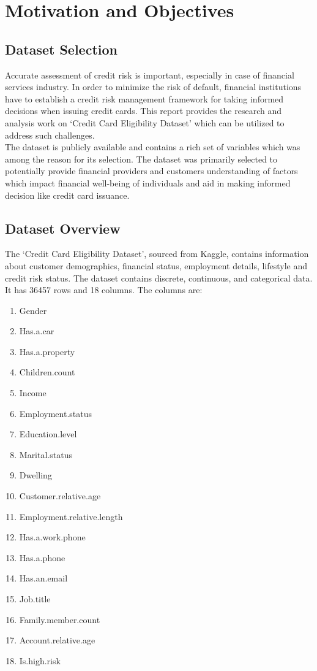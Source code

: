 \documentclass{article}\usepackage[]{graphicx}\usepackage[]{xcolor}
\begin{document}
\section{Motivation and Objectives}

\subsection{Dataset Selection}

Accurate assessment of credit risk is important, especially in case of financial services industry. In order to minimize the risk of default, financial institutions have to establish a credit risk management framework for taking informed decisions when issuing credit cards. This report provides the research and analysis work on `Credit Card Eligibility Dataset' which can be utilized to address such challenges. \\

The dataset is publicly available and contains a rich set of variables which was among the reason for its selection. The dataset was primarily selected to potentially provide financial providers and customers understanding of factors which impact financial well-being of individuals and aid in making informed decision like credit card issuance.

\subsection{Dataset Overview}

The `Credit Card Eligibility Dataset', sourced from Kaggle, contains information about customer demographics, financial status, employment details, lifestyle and credit risk status. The dataset contains discrete, continuous, and categorical data. It has 36457 rows and 18 columns. The columns are:

\begin{enumerate}
\item Gender
\item Has.a.car
\item Has.a.property
\item Children.count
\item Income
\item Employment.status
\item Education.level
\item Marital.status
\item Dwelling
\item Customer.relative.age
\item Employment.relative.length
\item Has.a.work.phone
\item Has.a.phone
\item Has.an.email
\item Job.title
\item Family.member.count
\item Account.relative.age
\item Is.high.risk\\
\end{enumerate}
\end{document}
